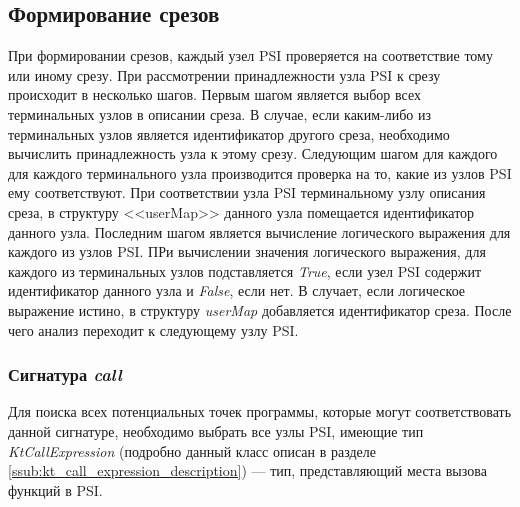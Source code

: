 \subsection{Формирование срезов}
\label{ssec:pointcut_creation_description}
При формировании срезов, каждый узел PSI проверяется на соответствие тому или
иному срезу.
При рассмотрении принадлежности узла PSI к срезу происходит в несколько шагов.
Первым шагом является выбор всех терминальных узлов в описании среза.
В случае, если каким-либо из терминальных узлов является идентификатор другого
среза, необходимо вычислить принадлежность узла к этому срезу.
Следующим шагом для каждого для каждого терминального узла производится
проверка на то, какие из узлов PSI ему соответствуют.
При соответствии узла PSI терминальному узлу описания среза, в структуру
<<userMap>> данного узла помещается идентификатор данного узла.
Последним шагом является вычисление логического выражения для каждого из узлов
PSI.
ПРи вычислении значения логического выражения, для каждого из терминальных узлов
подставляется \textit{True}, если узел PSI содержит идентификатор данного узла
и \textit{False}, если нет.
В случает, если логическое выражение истино, в структуру \textit{userMap}
добавляется идентификатор среза.
После чего анализ переходит к следующему узлу PSI.

\subsubsection{Сигнатура \textit{call}}
\label{ssub:call_signature_mark}
Для поиска всех потенциальных точек программы, которые могут соответствовать
данной сигнатуре, необходимо выбрать все узлы PSI, имеющие тип
\textit{KtCallExpression} (подробно данный класс описан в разделе
\ref{ssub:kt_call_expression_description}) --- тип, представляющий места вызова
функций в PSI.

